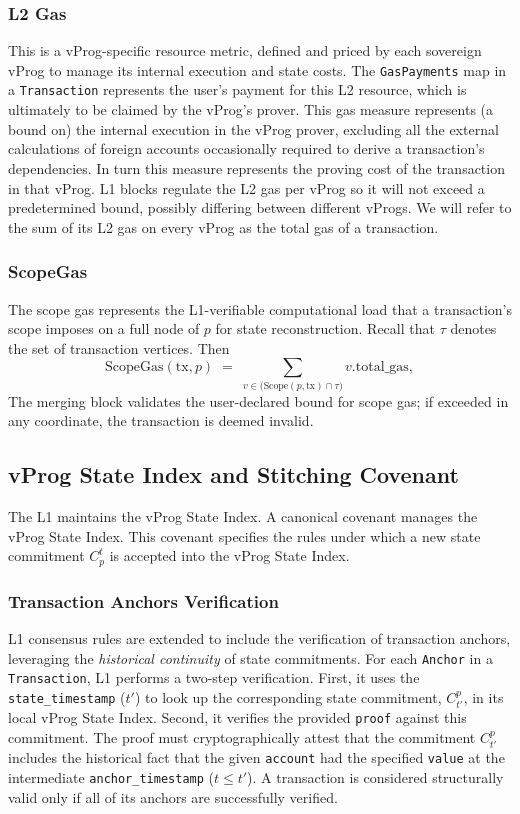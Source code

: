 \documentclass[onecolumn, 9pt, a4paper]{extarticle}
\begin{document}
\subsubsection{L2 Gas}
This is a vProg-specific resource metric, defined and priced by each sovereign vProg to manage its internal execution and state costs. The \texttt{GasPayments} map in a \texttt{Transaction} represents the user’s payment for this L2 resource, which is ultimately to be claimed by the vProg’s prover. This gas measure represents (a bound on) the internal execution in the vProg prover, excluding all the external calculations of foreign accounts occasionally required to derive a transaction’s dependencies. In turn this measure represents the proving cost of the transaction in that vProg. L1 blocks regulate the L2 gas per vProg so it will not exceed a predetermined bound, possibly differing between different vProgs. 
We will refer to the sum of its L2 gas on every vProg as the total gas of a transaction.


\subsubsection{ScopeGas}\label{sec:scopegas}
The scope gas  represents the L1-verifiable
computational load that a transaction’s scope imposes on a full node of $p$ for state reconstruction.
Recall that \(\tau\) denotes the set of transaction vertices. Then
\[
\mathrm{ScopeGas}(\mathrm{tx},p) \;=\; \sum_{v \in \big(\mathrm{Scope}(p,\mathrm{tx}) \cap \tau\big)} v.\mathrm{total\_gas},
\]
The merging block validates the user-declared bound for scope gas; if exceeded in any coordinate, the transaction is deemed invalid.

\subsection{vProg State Index and Stitching Covenant}
The L1 maintains the vProg State Index.
A canonical covenant manages the vProg State Index. This covenant specifies the rules under which
a new state commitment $C^t_p$ is accepted into the vProg State Index.

\subsubsection{Transaction Anchors Verification}\label{sec:tx-witness-verify}
L1 consensus rules are extended to include the verification of transaction anchors, leveraging the \emph{historical continuity} of state commitments. For each \texttt{Anchor} in a \texttt{Transaction}, L1 performs a two-step verification. First, it uses the \texttt{state\_timestamp} ($t'$) to look up the corresponding state commitment, $C^p_{t'}$, in its local vProg State Index. Second, it verifies the provided \texttt{proof} against this commitment. The proof must cryptographically attest that the commitment $C^p_{t'}$ includes the historical fact that the given \texttt{account} had the specified \texttt{value} at the intermediate \texttt{anchor\_timestamp} ($t \le t'$). A transaction is considered structurally valid only if all of its anchors are successfully verified.
\end{document}

